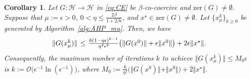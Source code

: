 \documentclass{article}
\theoremstyle{plain}
\newtheorem{corollary}{Corollary}[section]
\theoremstyle{definition}
\newcommand{\Hil}{\mathcal{H}}
\newcommand{\sets}[1]{\{#1\}}
\newcommand{\norms}[1]{\Vert#1\Vert}
\newcommand{\0}{\boldsymbol{0}}
\newcommand{\BigOs}[1]{\mathcal{O}\big(#1\big)}
\begin{document}
\begin{corollary}\label{co:convergence_of_AHP}
Let $G : \Hil \to \Hil$ in \eqref{eq:CE} be $\beta$-co-coercive and $\mathrm{zer}(G)\neq\emptyset$.
Suppose that $\mu := \epsilon > 0$, $0 < \eta \leq \frac{2\beta}{1 + 2\beta\epsilon}$, and $x^{\star} \in \mathrm{zer}(G)\neq\emptyset$.
Let $\sets{x^k_{\mu}}_{k\geq 0}$ be generated by Algorithm~\ref{alg:AHP_mu}.
Then, we have 
\begin{equation}\label{eq:AHP_mu_bound} 
\arraycolsep=0.2em
\begin{array}{lcl}
\norms{ G(x^k_{\mu}) }  & \leq & \frac{6(1 - \eta\epsilon)^{k-1}}{\eta^2\epsilon^2}\big(\norms{G(x^0)} + \epsilon\norms{x^0}\big)  +  2\epsilon\norms{x^{\star}}.
\end{array}
\end{equation}
Consequently, the maximum number of iterations $k$ to achieve  $\norms{ G(x^k_{\mu}) } \leq M_0\epsilon$ is $k := \BigOs{\epsilon^{-1}\ln(\epsilon^{-1})}$, where $M_0 := \frac{6}{\eta^2}\big(\norms{G(x^0)} + \norms{x^0}\big) + 2\norms{x^{\star}}$.

\end{corollary}
\end{document}
